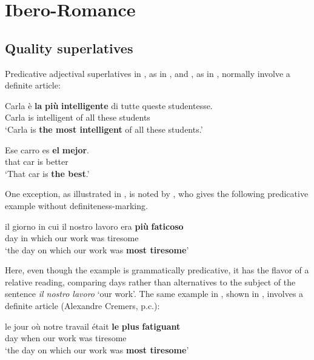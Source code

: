 \documentclass[output=paper
,modfonts
,nonflat]{langsci/langscibook}
\begin{document}
\section{Ibero-Romance}

\subsection{Quality superlatives}

Predicative adjectival superlatives in , as in , and , as in , normally involve a definite article:

\ea \label{ex:coppockstrand:52}
\gll Carla \`e \textbf{la} \textbf{pi\`u} \textbf{intelligente} di tutte queste studentesse.\\
Carla is  \cmpr{} intelligent of all these students\\ 
\glt`Carla is \textbf{the most intelligent} of all these students.' \citep[53]{deBoer1986}
\z

\ea \label{ex:coppockstrand:53}
\gll Ese carro es \textbf{el} \textbf{mejor}.\\
that car is  better\\ 
\glt`That car is \textbf{the best}.' \citep[1]{Rohena-Madrazo2007}
\z

One exception, as illustrated in , is noted by \citet[53]{deBoer1986}, who gives the following predicative example without definiteness-marking.

\ea \label{ex:coppockstrand:54}
\gll il giorno in cui il nostro lavoro era \textbf{pi\`u} \textbf{faticoso}\\
 day in which  our work was \cmpr{} tiresome\\ 
\glt `the day on which our work was \textbf{most tiresome}'
\z

Here, even though the example is grammatically predicative, it has the flavor of a relative reading, comparing days rather than  alternatives to the subject of the sentence \textit{il nostro lavoro} `our work'. The same example in , shown in , involves a definite article (Alexandre Cremers, p.c.):

\ea \label{ex:coppockstrand:55}
\gll le jour où notre travail était \textbf{le} \textbf{plus} \textbf{fatiguant}\\
 day when our work was  \cmpr{} tiresome\\ 
\glt `the day on which our work was \textbf{most tiresome}'
\z
\end{document}
